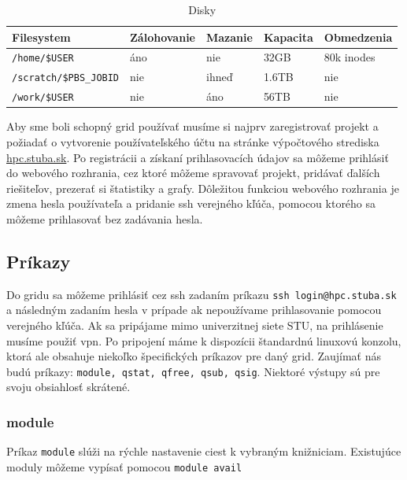 \begin{table}[!h]
\centering
\begin{tabular}{@{}lllll@{}}
\toprule
\textbf{Filesystem}   & \textbf{Zálohovanie} & \textbf{Mazanie} & \textbf{Kapacita} & \textbf{Obmedzenia} \\ \midrule
\texttt{/home/\$USER}          & áno                  & nie              & 32GB              & 80k inodes          \\
\texttt{/scratch/\$PBS\_JOBID} & nie                  & ihneď            & 1.6TB             & nie                 \\
\texttt{/work/\$USER}          & nie                  & áno              & 56TB              & nie                 \\ \bottomrule
\end{tabular}
\caption{Disky}
\label{tab:filesystem}
\end{table}

Aby sme boli schopný grid používať musíme si najprv zaregistrovať projekt a požiadať o vytvorenie
používateľského účtu na stránke výpočtového strediska \url{hpc.stuba.sk}.
Po registrácii a získaní prihlasovacích údajov sa môžeme prihlásiť do webového rozhrania, cez ktoré môžeme spravovať projekt,
pridávať ďalších riešiteľov, prezerať si štatistiky a grafy.
Dôležitou funkciou webového rozhrania je zmena hesla používateľa a pridanie \acrshort{ssh} verejného kľúča, pomocou ktorého sa môžeme prihlasovať bez zadávania hesla.

\subsection{Príkazy}
Do gridu sa môžeme prihlásiť cez \acrshort{ssh} zadaním príkazu \texttt{ssh login@hpc.stuba.sk} a následným zadaním hesla v prípade ak nepoužívame prihlasovanie pomocou verejného kľúča.
Ak sa pripájame mimo univerzitnej siete STU, na prihlásenie musíme použiť \acrshort{vpn}.
Po pripojení máme k dispozícii štandardnú linuxovú konzolu, ktorá ale obsahuje niekoľko špecifických príkazov pre daný grid.
Zaujímať nás budú príkazy: \texttt{module, qstat, qfree, qsub, qsig}.
Niektoré výstupy sú pre svoju obsiahlosť skrátené.

\subsubsection{module}
Príkaz \texttt{module} slúži na rýchle nastavenie ciest k vybraným knižniciam. Existujúce moduly môžeme vypísať pomocou \texttt{module avail}

